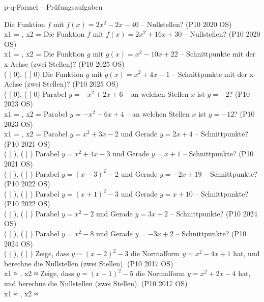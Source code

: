 \begin{aufgabe}{p-q-Formel – Prüfungsaufgaben}
\begin{teile}
\steil Die Funktion $f$ mit $f(x) = 2x^2 - 2x - 40$ – Nullstellen? \hfill (P10 2020 OS) \\ x1 = \leerfeld , x2 = \leerfeld
\steil Die Funktion $f$ mit $f(x) = 2x^2 + 16x + 30$ – Nullstellen? \hfill (P10 2020 OS) \\ x1 = \leerfeld , x2 = \leerfeld
\steil Die Funktion $g$ mit $g(x) = x^2 - 10x + 22$ – Schnittpunkte mit der x-Achse (zwei Stellen)? \hfill (P10 2025 OS) \\ ( \leerfeld | 0), ( \leerfeld | 0)
\steil Die Funktion $g$ mit $g(x) = x^2 + 4x - 1$ – Schnittpunkte mit der x-Achse (zwei Stellen)? \hfill (P10 2025 OS) \\ ( \leerfeld | 0), ( \leerfeld | 0)
\steil Parabel $y = -x^2 + 2x + 6$ – an welchen Stellen $x$ ist $y = -2$? \hfill (P10 2023 OS) \\ x1 = \leerfeld , x2 = \leerfeld
\steil Parabel $y = -x^2 - 6x + 4$ – an welchen Stellen $x$ ist $y = -12$? \hfill (P10 2023 OS) \\ x1 = \leerfeld , x2 = \leerfeld
\steil Parabel $y = x^2 + 3x - 2$ und Gerade $y = 2x + 4$ – Schnittpunkte? \hfill (P10 2021 OS) \\ ( \leerfeld | \leerfeld ), ( \leerfeld | \leerfeld )
\steil Parabel $y = x^2 + 4x - 3$ und Gerade $y = x + 1$ – Schnittpunkte? \hfill (P10 2021 OS) \\ ( \leerfeld | \leerfeld ), ( \leerfeld | \leerfeld )
\steil Parabel $y = (x - 3)^2 - 2$ und Gerade $y = -2x + 19$ – Schnittpunkte? \hfill (P10 2022 OS) \\ ( \leerfeld | \leerfeld ), ( \leerfeld | \leerfeld )
\steil Parabel $y = (x + 1)^2 - 3$ und Gerade $y = x + 10$ – Schnittpunkte? \hfill (P10 2022 OS) \\ ( \leerfeld | \leerfeld ), ( \leerfeld | \leerfeld )
\steil Parabel $y = x^2 - 2$ und Gerade $y = 3x + 2$ – Schnittpunkte? \hfill (P10 2024 OS) \\ ( \leerfeld | \leerfeld ), ( \leerfeld | \leerfeld )
\steil Parabel $y = x^2 - 8$ und Gerade $y = -3x + 2$ – Schnittpunkte? \hfill (P10 2024 OS) \\ ( \leerfeld | \leerfeld ), ( \leerfeld | \leerfeld )
\steil Zeige, dass $y = (x - 2)^2 - 3$ die Normalform $y = x^2 - 4x + 1$ hat, und berechne die Nullstellen (zwei Stellen). \hfill (P10 2017 OS) \\ x1 ≈ \leerfeld , x2 ≈ \leerfeld
\steil Zeige, dass $y = (x + 1)^2 - 5$ die Normalform $y = x^2 + 2x - 4$ hat, und berechne die Nullstellen (zwei Stellen). \hfill (P10 2017 OS) \\ x1 ≈ \leerfeld , x2 ≈ \leerfeld
\end{teile}
\end{aufgabe}
